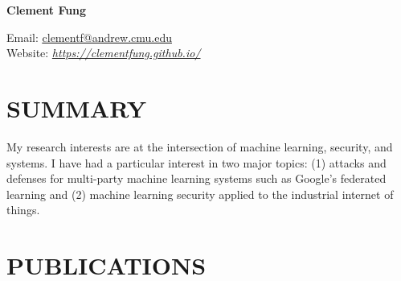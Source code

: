 \documentclass[10pt]{res} %
\begin{document}
{\huge \bf Clement Fung} \hfill 

Email: \href{mailto:clementf@andrew.cmu.edu}{\underline{clementf@andrew.cmu.edu}} \\ 
Website: \href{https://clementfung.github.io/}{\emph{https://clementfung.github.io/}} \\


\section{SUMMARY}

\vspace{0.2in} %

My research interests are at the intersection of machine learning, security, and systems. I have had a particular interest in two major topics: (1) attacks and defenses for multi-party machine learning systems such as Google's federated learning and (2) machine learning security applied to the industrial internet of things.


\section{PUBLICATIONS}

\vspace{0.2in} %
\end{document}
